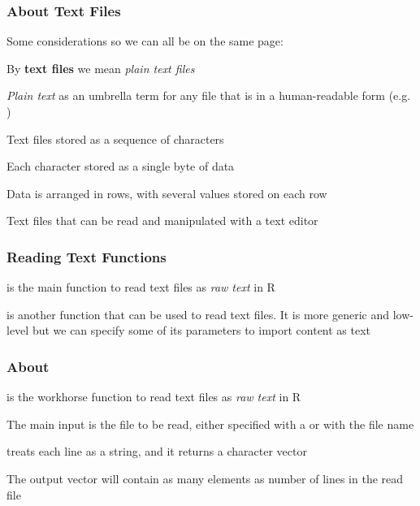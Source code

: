 \documentclass[12pt]{beamer}\usepackage[]{graphicx}\usepackage[]{color}
\begin{document}
\begin{frame}
\frametitle{About Text Files}

Some considerations so we can all be on the same page:
\bi
 \item By \textbf{text files} we mean \textit{plain text files} \\
 \item \textit{Plain text} as an umbrella term for any file that is in a human-readable form (e.g. )
 \item Text files stored as a sequence of characters 
 \item Each character stored as a single byte of data
 \item Data is arranged in rows, with several values stored on each row
 \item Text files that can be read and manipulated with a text editor
\ei

\end{frame}


\begin{frame}
\frametitle{Reading Text Functions}

\bi
 \item {\hilit {}} is the main function to read text files as \textit{raw text} in R
 \item {\hilit {}} is another function that can be used to read text files. It is more generic and low-level but we can specify some of its parameters to import content as text
\ei
\eb

\end{frame}


\begin{frame}
\frametitle{About }

\bi
 \item {\hilit {}} is the workhorse function to read text files as \textit{raw text} in R

 \item The main input is the file to be read, either specified with a {\hilit {}} or with the file name 

\item {} treats each line as a string, and it returns a character vector

 \item The output vector will contain as many elements as number of lines in the read file
\ei
\eb

\end{frame}
\end{document}
